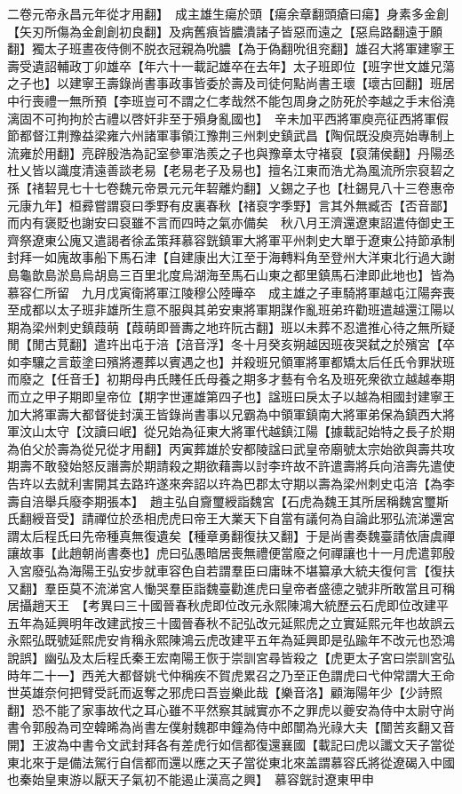 二卷元帝永昌元年從才用翻】　成主雄生瘍於頭【瘍余章翻頭瘡曰瘍】身素多金創【矢刃所傷為金創創初良翻】及病舊㾗皆膿潰諸子皆惡而遠之【惡烏路翻遠于願翻】獨太子班晝夜侍側不脱衣冠親為吮膿【為于偽翻吮徂兖翻】雄召大將軍建寧王壽受遺詔輔政丁卯雄卒【年六十一載記雄卒在去年】太子班即位【班字世文雄兄蕩之子也】以建寧王壽錄尚書事政事皆委於壽及司徒何點尚書王瓌【瓌古回翻】班居中行喪禮一無所預【李班豈可不謂之仁孝哉然不能包周身之防死於李越之手末俗澆漓固不可拘拘於古禮以啓奸非至于殞身亂國也】　辛未加平西將軍庾亮征西將軍假節都督江荆豫益梁雍六州諸軍事領江豫荆三州刺史鎮武昌【陶侃既没庾亮始專制上流雍於用翻】亮辟殷浩為記室參軍浩羨之子也與豫章太守褚裒【裒蒲侯翻】丹陽丞杜乂皆以識度清遠善談老易【老易老子及易也】擅名江東而浩尤為風流所宗裒䂮之孫【禇䂮見七十七卷魏元帝景元元年䂮離灼翻】乂錫之子也【杜錫見八十三卷惠帝元康九年】桓彛嘗謂裒曰季野有皮裏春秋【禇裒字季野】言其外無臧否【否音鄙】而内有褒貶也謝安曰裒雖不言而四時之氣亦備矣　秋八月王濟還遼東詔遣侍御史王齊祭遼東公廆又遣謁者徐孟策拜慕容皝鎮軍大將軍平州刺史大單于遼東公持節承制封拜一如廆故事船下馬石津【自建康出大江至于海轉料角至登州大洋東北行過大謝島龜歆島淤島烏胡島三百里北度烏湖海至馬石山東之都里鎮馬石津即此地也】皆為慕容仁所留　九月戊寅衛將軍江陵穆公陸曄卒　成主雄之子車騎將軍越屯江陽奔喪至成都以太子班非雄所生意不服與其弟安東將軍期謀作亂班弟玝勸班遣越還江陽以期為梁州刺史鎮葭萌【葭萌即晉夀之地玝阮古翻】班以未葬不忍遣推心待之無所疑閒【閒古莧翻】遣玝出屯于涪【涪音浮】冬十月癸亥朔越因班夜哭弑之於殯宮【卒如李驤之言菆塗曰殯將遷葬以賓遇之也】并殺班兄領軍將軍都矯太后任氏令罪狀班而廢之【任音壬】初期母冉氏賤任氏母養之期多才藝有令名及班死衆欲立越越奉期而立之甲子期即皇帝位【期字世運雄第四子也】諡班曰戾太子以越為相國封建寧王加大將軍壽大都督徙封漢王皆錄尚書事以兄霸為中領軍鎮南大將軍弟保為鎮西大將軍汶山太守【汶讀曰岷】從兄始為征東大將軍代越鎮江陽【據載記始特之長子於期為伯父於壽為從兄從才用翻】丙寅葬雄於安都陵諡曰武皇帝廟號太宗始欲與壽共攻期壽不敢發始怒反譖壽於期請殺之期欲藉壽以討李玝故不許遣壽將兵向涪壽先遣使告玝以去就利害開其去路玝遂來奔詔以玝為巴郡太守期以壽為梁州刺史屯涪【為李壽自涪舉兵廢李期張本】　趙主弘自齎璽綬詣魏宮【石虎為魏王其所居稱魏宮璽斯氏翻綬音受】請禪位於丞相虎虎曰帝王大業天下自當有議何為自論此邪弘流涕還宮謂太后程氏曰先帝種真無復遺矣【種章勇翻復扶又翻】于是尚書奏魏臺請依唐虞禪讓故事【此趙朝尚書奏也】虎曰弘愚暗居喪無禮便當廢之何禪讓也十一月虎遣郭殷入宮廢弘為海陽王弘安步就車容色自若謂羣臣曰庸昧不堪纂承大統夫復何言【復扶又翻】羣臣莫不流涕宮人慟哭羣臣詣魏臺勸進虎曰皇帝者盛德之號非所敢當且可稱居攝趙天王　【考異曰三十國晉春秋虎即位改元永熙陳鴻大統歷云石虎即位改建平五年為延興明年改建武按三十國晉春秋不記弘改元延熙虎之立實延熙元年也故誤云永熙弘既號延熙虎安肯稱永熙陳鴻云虎改建平五年為延興即是弘踰年不改元也恐鴻說誤】幽弘及太后程氏秦王宏南陽王恢于崇訓宮尋皆殺之【虎更太子宮曰崇訓宮弘時年二十一】西羌大都督姚弋仲稱疾不賀虎累召之乃至正色謂虎曰弋仲常謂大王命世英雄奈何把臂受託而返奪之邪虎曰吾豈樂此哉【樂音洛】顧海陽年少【少詩照翻】恐不能了家事故代之耳心雖不平然察其誠實亦不之罪虎以夔安為侍中太尉守尚書令郭殷為司空韓晞為尚書左僕射魏郡申鐘為侍中郎闓為光祿大夫【闓苦亥翻又音開】王波為中書令文武封拜各有差虎行如信都復還襄國【載記曰虎以讖文天子當從東北來于是備法駕行自信都而還以應之天子當從東北來盖謂慕容氏將從遼碣入中國也秦始皇東游以厭天子氣初不能遏止漢高之興】　慕容皝討遼東甲申